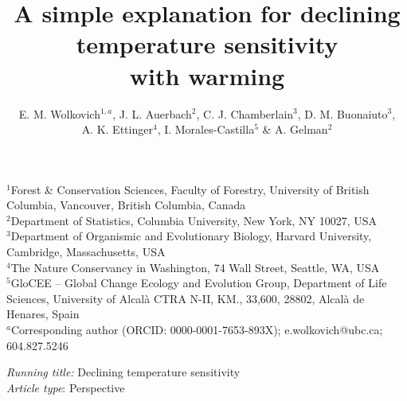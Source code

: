 \documentclass[11pt,letter]{article}
\begin{document}
\title{A simple explanation for declining temperature sensitivity \\ with warming} %
\author{E. M. Wolkovich$^{1,a}$,  J. L. Auerbach$^{2}$, C. J. Chamberlain$^{3}$, D. M. Buonaiuto$^{3}$, \\ A. K. Ettinger$^4$, I. Morales-Castilla$^{5}$ \& A. Gelman$^{2}$} 
\date{} %
\maketitle
$^1$Forest \& Conservation Sciences, Faculty of Forestry, University of British Columbia, Vancouver, British Columbia, Canada\\
$^2$Department of Statistics, Columbia University, New York, NY 10027, USA\\
$^3$Department of Organismic and Evolutionary Biology, Harvard University, Cambridge, Massachusetts, USA\\
$^4$The Nature Conservancy in Washington, 74 Wall Street, Seattle, WA, USA\\
$^5$GloCEE -- Global Change Ecology and Evolution Group, Department of Life Sciences, University of Alcal\`a CTRA N-II, KM., 33,600, 28802, Alcal\`a de Henares, Spain\\
$^a$Corresponding author (ORCID: 0000-0001-7653-893X); e.wolkovich@ubc.ca; 604.827.5246
\vspace{3ex}

\emph{Running title:} Declining temperature sensitivity\\
\emph{Article type}: Perspective\\

\end{document}
